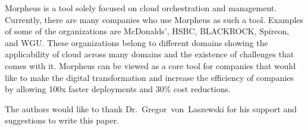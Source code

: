 Morpheus is a tool solely focused on cloud orchestration and management. 
Currently, there are many companies who use Morpheus as such a tool. 
Examples of some of the organizations are McDonalds', HSBC, BLACKROCK, Spireon, 
and WGU. These organizations belong to different domains showing the 
applicability of cloud across many domains and the existence of challenges 
that comes with it. Morpheus can be viewed as a core tool for companies that 
would like to make the digital transformation and increase the efficiency of 
companies by allowing 100x faster deployments and 30\% cost reductions.  

\begin{acks}

  The authors would like to thank Dr.~Gregor~von~Laszewski for his
  support and suggestions to write this paper.

\end{acks}


 

